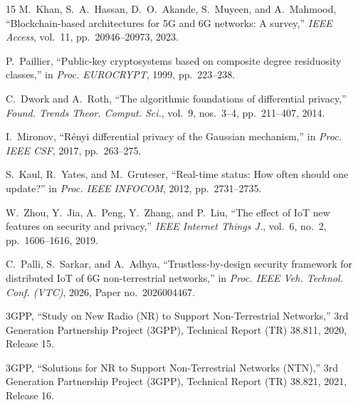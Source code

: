 \documentclass[journal,twoside,10pt]{IEEEtran}
\begin{document}
\begin{thebibliography}{15}
M.~Khan, S.~A.~Hassan, D.~O.~Akande, S.~Muyeen, and A.~Mahmood,
``Blockchain-based architectures for 5G and 6G networks: A survey,''
\textit{IEEE Access}, vol.~11, pp.~20946--20973, 2023.

P.~Paillier,
``Public-key cryptosystems based on composite degree residuosity
classes,''
in \textit{Proc. EUROCRYPT}, 1999, pp.~223--238.

C.~Dwork and A.~Roth,
``The algorithmic foundations of differential privacy,''
\textit{Found. Trends Theor. Comput. Sci.}, vol.~9, nos.~3--4,
pp.~211--407, 2014.

I.~Mironov,
``R\'{e}nyi differential privacy of the Gaussian mechanism,''
in \textit{Proc. IEEE CSF}, 2017, pp.~263--275.

S.~Kaul, R.~Yates, and M.~Gruteser,
``Real-time status: How often should one update?''
in \textit{Proc. IEEE INFOCOM}, 2012, pp.~2731--2735.

W.~Zhou, Y.~Jia, A.~Peng, Y.~Zhang, and P.~Liu,
``The effect of IoT new features on security and privacy,''
\textit{IEEE Internet Things J.}, vol.~6, no.~2, pp.~1606--1616, 2019.

C.~Palli, S.~Sarkar, and A.~Adhya,
``Trustless-by-design security framework for distributed IoT of 6G
non-terrestrial networks,''
in \textit{Proc. IEEE Veh. Technol. Conf. (VTC)}, 2026,
Paper no.~2026004467.

3GPP, ``Study on New Radio (NR) to Support Non-Terrestrial Networks,''
3rd Generation Partnership Project (3GPP),
Technical Report (TR) 38.811, 2020, Release 15.

3GPP, ``Solutions for NR to Support Non-Terrestrial Networks (NTN),''
3rd Generation Partnership Project (3GPP),
Technical Report (TR) 38.821, 2021, Release 16.

\end{thebibliography}
\end{document}
